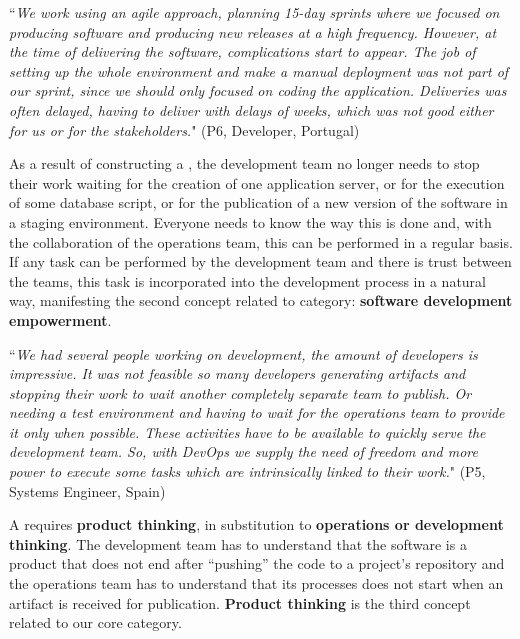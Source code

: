 \begin{mq}
  ``\emph{We work using an agile approach, planning 15-day sprints where we focused on
producing software and producing new releases at a high frequency. However, at the time of
delivering the software, complications start to appear. The job of setting up
the whole environment and make a manual deployment was not part of our
sprint, since we should only focused on coding the application. Deliveries was often delayed,
having to deliver with delays of weeks, which was not good either for us or for
the stakeholders.}" (P6, Developer, Portugal)
\end{mq}

As a result of constructing a , the development
team no longer needs to stop their work waiting for the creation
of one application server, or for the execution of some database script, or for
the publication of a new version of the software in a staging environment.
Everyone needs to know the way this is done and, with the collaboration of the
operations team, this can be performed in a regular basis. If any task can be
performed by the development team and there is trust between the teams, this task is
incorporated into the development process in a natural way, manifesting the
second concept related to  category: \textbf{software
development empowerment}.

\begin{mq}
``\emph{We had several people working on development, the amount of developers is
impressive. It was not feasible so many developers generating artifacts and
stopping their work to wait another completely separate team to publish. Or
needing a test environment and having to wait for the operations team to
provide it only when possible. These activities have to be available to quickly
serve the development team. So, with DevOps we supply the need of freedom and
more power to execute some tasks which are intrinsically linked to their work.}"
(P5, Systems Engineer, Spain)
\end{mq}

A  requires  \textbf{product thinking}, in substitution to
\textbf{operations or development thinking}. The development team has to understand that
the software is a product that does not end after ``pushing'' the code to a
project's repository and the operations team has to understand that its processes does not
start when an artifact is received for publication. \textbf{Product thinking}
is the third concept related to our core category.

